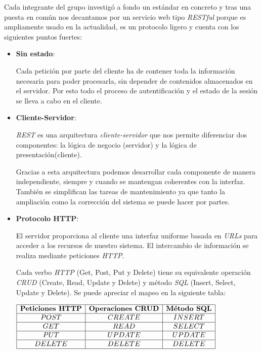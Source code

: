 Cada integrante del grupo investigó a fondo un estándar en concreto y tras una puesta en común nos decantamos por un servicio web tipo \textit{RESTful} porque es ampliamente usado en la actualidad, es un protocolo ligero y cuenta con los siguientes puntos fuertes:
\begin{itemize}
\item \textbf{Sin estado}:

Cada petición por parte del cliente ha de contener toda la información necesaria para poder procesarla, sin depender de contenidos almacenados en el servidor. Por esto todo el proceso de autentificación y el estado de la sesión se lleva a cabo en el cliente.

\item \textbf{Cliente-Servidor}:

\textit{REST} es una arquitectura \textit{cliente-servidor} que nos permite diferenciar dos componentes: la lógica de negocio (servidor) y la lógica de presentación(cliente).
 
Gracias a esta arquitectura podemos desarrollar cada componente de manera independiente, siempre y cuando se mantengan coherentes con la interfaz. También se simplifican las tareas de mantenimiento ya que tanto la ampliación como la corrección del sistema se puede hacer por partes.

\item \textbf{Protocolo HTTP}:

El servidor proporciona al cliente una interfaz uniforme basada en \textit{URLs} para acceder a los recursos de nuestro sistema. El intercambio de información se realiza mediante peticiones \textit{HTTP}.

Cada verbo \textit{HTTP} (Get, Post, Put y Delete) tiene su equivalente operación \textit{CRUD} (Create, Read, Update y Delete) y método \textit{SQL} (Insert, Select, Update y Delete). Se puede apreciar el mapeo en la siguiente tabla:


$
\begin{array}{|c|c|c|}
\hline
\textbf{Peticiones HTTP} & \textbf{Operaciones CRUD} & \textbf{Método SQL}\\
\hline
POST & CREATE & INSERT\\
\hline
GET & READ & SELECT\\
\hline
PUT & UPDATE & UPDATE\\
\hline
DELETE & DELETE & DELETE\\
\hline
\end{array}
$

\end{itemize} 

